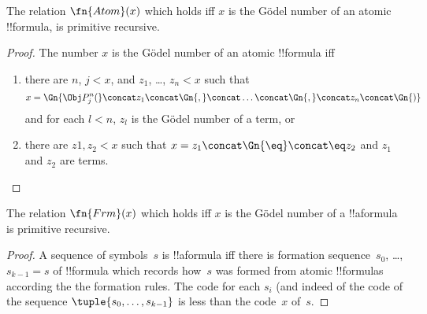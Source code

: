\documentclass[../../include/open-logic-section]{subfiles}
\begin{document}

\begin{prop}
The relation $\fn{Atom}(x)$ which holds iff $x$ is the G\"odel number
of an atomic !!{formula}, is primitive recursive.
\end{prop}

\begin{proof}
The number $x$ is the G\"odel number of an atomic !!{formula} iff
\begin{enumerate}
\item there are $n$, $j < x$, and $z_1$, \dots, $z_n < x$ such that
\[
x = \Gn{\Obj P^n_j(} \concat z_1 \concat \Gn{,} \concat \dots \concat
\Gn{,} \concat z_n \concat \Gn{)}
\]
and for each $l < n$, $z_l$ is the G\"odel number of a term, or
\item there are $z1, z_2 < x$ such that $x = z_1 \concat \Gn{\eq}
  \concat \eq z_2$ and $z_1$ and $z_2$ are terms.
\end{enumerate}
\end{proof}

\begin{prop}
The relation $\fn{Frm}(x)$ which holds iff $x$ is the G\"odel number
of a !!a{formula} is primitive recursive.
\end{prop}

\begin{proof}
A sequence of symbols~$s$ is !!a{formula} iff there is formation
sequence~$s_0$, \dots, $s_{k-1} = s$ of !!{formula} which records
how~$s$ was formed from atomic !!{formula}s according the the
formation rules.  The code for each $s_i$ (and indeed of the code of
the sequence $\tuple{s_0, \dots, s_{k-1}}$ is less than the code~$x$
of~$s$.
\end{proof}
\end{document}
